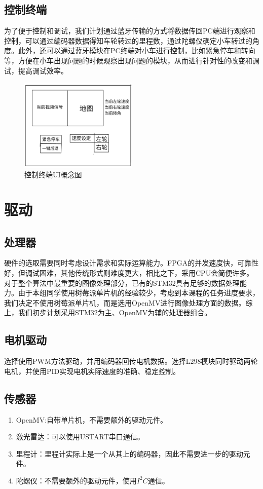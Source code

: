 \documentclass{report}
\begin{document}
\subsection{控制终端}
\label{subsec:label}
为了便于控制和调试，我们计划通过蓝牙传输的方式将数据传回PC端进行观察和控制，可以通过编码器数据得知车轮转过的里程数，通过陀螺仪确定小车转过的角度。此外，还可以通过蓝牙模块在PC终端对小车进行控制，比如紧急停车和转向等，方便在小车出现问题的时候观察出现问题的模块，从而进行针对性的改变和调试，提高调试效率。
\begin{figure}[ht]
  \centering
  \includegraphics[width=0.5\textwidth]{figures/ui.jpg}
  \caption{控制终端UI概念图 }
\end{figure}


\section{驱动}
\label{sec:label}
\subsection{处理器}
硬件的选取需要同时考虑设计需求和实际运算能力。FPGA的并发速度快，可靠性好，但调试困难，其他传统形式则难度更大，相比之下，采用CPU会简便许多。对于整个算法中最重要的图像处理部分，已有的STM32具有足够的数据处理能力。由于本组同学使用树莓派单片机的经验较少，考虑到本课程的任务进度要求，我们决定不使用树莓派单片机，而是选用OpenMV进行图像处理方面的数据。综上，我们初步计划采用STM32为主、OpenMV为辅的处理器组合。

\label{subsec:label}
\subsection{电机驱动}
\label{subsec:label}
选择使用PWM方法驱动，并用编码器回传电机数据。选择L298模块同时驱动两轮电机，并使用PID实现电机实际速度的准确、稳定控制。
\subsection{传感器}
\label{subsec:label}
\begin{enumerate}
\item OpenMV:自带单片机，不需要额外的驱动元件。
\item 激光雷达：可以使用USTART串口通信。
\item 里程计：里程计实际上是一个从其上的编码器，因此不需要进一步的驱动元件。
  \item 陀螺仪：不需要额外的驱动元件，使用$I^{2}C$通信。

  \end{enumerate}
  \newpage
\end{document}
